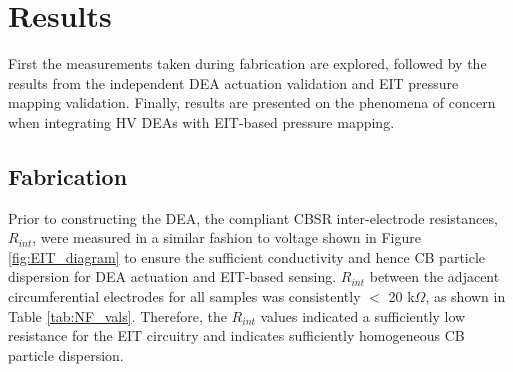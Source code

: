 \section{Results} %
\label{sec:results}
First the measurements taken during fabrication are explored, followed by the results from the independent DEA actuation validation and EIT pressure mapping validation. Finally, results are presented on the phenomena of concern when integrating HV DEAs with EIT-based pressure mapping.


\subsection{Fabrication}
\label{subsec:fab_results}
Prior to constructing the DEA, the compliant CBSR inter-electrode resistances, $R_{int}$, were measured  in a similar fashion to voltage shown in Figure \ref{fig:EIT_diagram} to ensure the sufficient conductivity and hence CB particle dispersion for DEA actuation and EIT-based sensing. $R_{int}$ between the adjacent circumferential electrodes for all samples was consistently $<$ 20 k$\Omega$, as shown in Table \ref{tab:NF_vals}. Therefore, the $R_{int}$ values indicated a sufficiently low resistance for the EIT circuitry and indicates sufficiently homogeneous CB particle dispersion.


